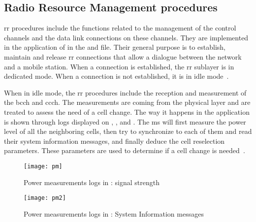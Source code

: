   \iffalse
  The procedures introduced in this section are placed in context in
  complete examples in \Sref{} and \Sref{}. They are also shown in
  \Sref{}, where the use of the \proj{OsmocomBB} applications is
  demonstrated. 
  \fi

  \subsection{Radio Resource Management procedures}
  \label{sec:rr_proc}

    \gls{rr} procedures include the functions related to the management
    of the control channels and the data link connections on these
    channels. They are implemented in the  application of
     in the  and
     file. Their general purpose is to establish,
    maintain and release \gls{rr} connections that allow a dialogue
    between the network and a mobile station. When a connection is
    established, the \gls{rr} sublayer is in dedicated mode. When a
    connection is not established, it is in idle
    mode~\cite{3gpp_ts_2015-2}.

    When in idle mode, the \gls{rr} procedures include the reception and
    measurement of the \gls{bcch} and \gls{ccch}. The measurements are
    coming from the physical layer and are treated to assess the need of
    a cell change. The way it happens in the  application
    is shown through logs displayed on , ,
    and . The \gls{ms} will first measure the power level
    of all the neighboring cells, then try to synchronize to each of
    them and read their system information messages, and finally deduce
    the cell reselection parameters. These parameters are used to
    determine if a cell change is needed~\cite{3gpp_ts_2014-8}.

      \begin{figure}[p]
        \centering
        \texttt{[image: pm]}
        \caption{Power measurements logs in : signal
        strength}
        \label{fig:pm}
      \end{figure}

      \begin{figure}[p]
        \centering
        \texttt{[image: pm2]}
        \caption{Power measurements logs in : System
        Information messages}
        \label{fig:pm2}
      \end{figure}

